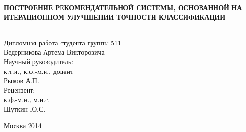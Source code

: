 \begin{titlepage}
\begin{figure}[htbp]
\begin{center}
\end{center}

\end{figure}


\begin{center}
{\LARGE \bf ПОСТРОЕНИЕ РЕКОМЕНДАТЕЛЬНОЙ СИСТЕМЫ, ОСНОВАННОЙ НА ИТЕРАЦИОННОМ УЛУЧШЕНИИ ТОЧНОСТИ КЛАССИФИКАЦИИ\\
}\\
\end{center}
\vfill


\bigskip
\begin{flushright}
Дипломная работа студента группы 511\\
 Ведерникова Артема Викторовича\\
Научный руководитель:\\ к.т.н., к.ф.-м.н., доцент \\Рыжов А.П.\\
Рецензент: \\к.ф.-м.н., м.н.с. \\
Шуткин Ю.С. 
\end{flushright}
\vfill \vfill \centerline{Москва 2014} \break
\end{titlepage}